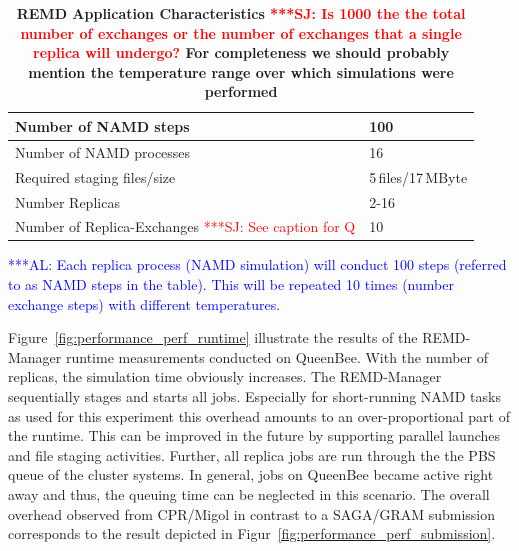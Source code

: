 \documentclass[times, 10pt, twocolumn]{article}
\newcommand{\alnote}[1]{ {\textcolor{blue} { ***AL: #1 }}}
\newcommand{\jhanote}[1]{ {\textcolor{red} { ***SJ: #1 }}}
\newcommand{\alnote}[1]{}
\newcommand{\jhanote}[1]{}
\begin{document}
\begin{table}        
    \centering
	\begin{tabular}{|p{5cm}|l|}
          \hline
          Number of NAMD steps &100\\ \hline 
          Number of NAMD processes &16\\ \hline 
          Required staging files/size &5\,files/17\,MByte\\ \hline
          Number Replicas &2-16 \\ \hline
          Number of Replica-Exchanges \jhanote{See caption for Q} &10\\ \hline
	\end{tabular}
	\caption{\small \bf REMD Application Characteristics\label{tab:app_stats}
          \jhanote{Is 1000 the the total number of exchanges or the
            number of exchanges that a single replica will undergo?}
          For completeness we should probably mention the temperature
          range over which simulations were performed}
          \alnote{Each replica process (NAMD simulation) will conduct 100 steps (referred to as NAMD steps in the table). This will be repeated 10 times (number exchange steps) with different temperatures.}
\end{table}   

Figure~\ref{fig:performance_perf_runtime} illustrate the results of
the REMD-Manager runtime measurements conducted on QueenBee. With the
number of replicas, the simulation time obviously increases.  The
REMD-Manager sequentially stages and starts all jobs.  Especially for
short-running NAMD tasks as used for this experiment this overhead
amounts to an over-proportional part of the runtime. This can be
improved in the future by supporting parallel launches and file
staging activities.  Further, all replica jobs are run through the the
PBS queue of the cluster systems.  In general, jobs on QueenBee became
active right away and thus, the queuing time can be neglected in this
scenario.  The overall overhead observed from CPR/Migol in contrast to
a SAGA/GRAM submission corresponds to the result depicted in
Figur~\ref{fig:performance_perf_submission}.
\end{document}
